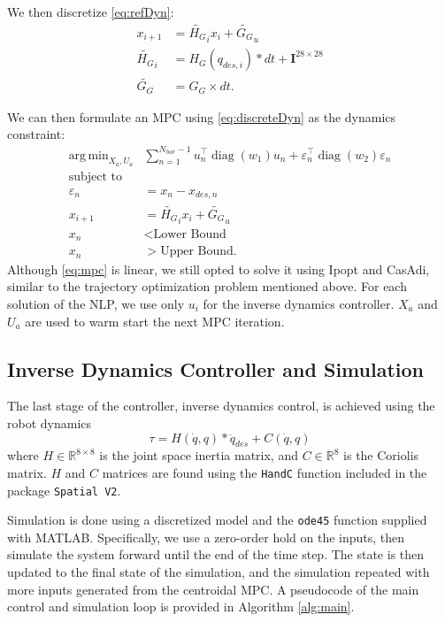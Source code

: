 \documentclass[conference]{IEEEtran}
\DeclareMathOperator*{\argmin}{arg\,min}
\DeclareMathOperator{\diag}{diag}
\begin{document}
We then discretize \eqref{eq:refDyn}:
\begin{align}
    x_{i+1} & = \widetilde{H_G}_{i} x_i + \widetilde{G_G}_u \label{eq:discreteDyn}\\
    \widetilde{H_G}_{i} & = H_G(q_{des, i}) * dt + \mathbf{I} ^{28 \times 28} \\
    \widetilde{G_G} & = G_G \times dt.
\end{align}

We can then formulate an MPC using \eqref{eq:discreteDyn} as the dynamics constraint:
\begin{align}
    \argmin_{X_a, U_a}& \sum^{N_{hor}-1}_{n=1} u_n^\top \diag(w_1) u_n + \varepsilon_n^\top \diag(w_2) \varepsilon_n \label{eq:mpc}\\
     \text{subject to} & \nonumber \\
    \varepsilon_n & = x_n - x_{des, n} \\
     x_{i+1} & = \widetilde{H_G}_{i} x_i + \widetilde{G_G}_u\\
     x_n &< \text{Lower Bound} \\
     x_n &> \text{Upper Bound}.
\end{align}
Although \eqref{eq:mpc} is linear, we still opted to solve it using Ipopt and CasAdi, similar to the trajectory optimization problem mentioned above. For each solution of the NLP, we use only $u_i$ for the inverse dynamics controller. $X_a$ and $U_a$ are used to warm start the next MPC iteration.

\subsection{Inverse Dynamics Controller and Simulation}

The last stage of the controller, inverse dynamics control, is achieved using the robot dynamics
\begin{equation}
    \tau = H(\dot{q}, q) * \ddot{q}_{des} + C(\dot{q}, q)
\end{equation}
where $H \in \mathbb{R}^{8 \times 8}$ is the joint space inertia matrix, and $C \in \mathbb{R}^{8}$ is the Coriolis matrix. $H$ and $C$ matrices are found using the \texttt{HandC} function included in the package \texttt{Spatial V2}.

Simulation is done using a discretized model and the \texttt{ode45} \cite{shampine1997matlab} function supplied with MATLAB. Specifically, we use a zero-order hold on the inputs, then simulate the system forward until the end of the time step. The state is then updated to the final state of the simulation, and the simulation repeated with more inputs generated from the centroidal MPC. A pseudocode of the main control and simulation loop is provided in Algorithm \ref{alg:main}.
\end{document}
